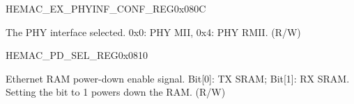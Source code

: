 \begin{register}{H}{EMAC\_EX\_PHYINF\_CONF\_REG}{0x080C}\label{regdesc:EMACEXPHYINFCONFREG}
%
%
%
\regnewline%
\begin{regdesc}\begin{reglist}
\item [EMAC\_PHY\_INTF\_SEL]The PHY interface selected. 0x0: PHY MII, 0x4: PHY RMII. (R/W)
\end{reglist}\end{regdesc}
\end{register}


\begin{register}{H}{EMAC\_PD\_SEL\_REG}{0x0810}\label{regdesc:EMACPDSELREG}
%
%
\regnewline%
\begin{regdesc}\begin{reglist}
\item [EMAC\_RAM\_PD\_EN]Ethernet RAM power-down enable signal. Bit[0]: TX SRAM; Bit[1]: RX SRAM. Setting the bit to 1 powers down the RAM. (R/W)
\end{reglist}\end{regdesc}
\end{register}



